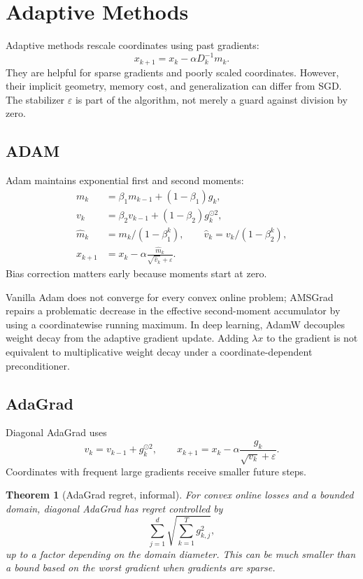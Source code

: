 \documentclass[12pt,oneside]{book}
\numberwithin{equation}{section}
\theoremstyle{definition}
\theoremstyle{plain}
\newtheorem{theorem}{Theorem}[section]
\theoremstyle{remark}
\begin{document}
\section{Adaptive Methods}

Adaptive methods rescale coordinates using past gradients:
\[
    x_{k+1}=x_k-\alpha D_k^{-1}m_k.
\]
They are helpful for sparse gradients and poorly scaled coordinates.
However, their implicit geometry, memory cost, and generalization can differ
from SGD. The stabilizer $\varepsilon$ is part of the algorithm, not merely a
guard against division by zero.

\subsection{ADAM}

Adam maintains exponential first and second moments:
\begin{align*}
 m_k&=\beta_1m_{k-1}+(1-\beta_1)g_k,\\
 v_k&=\beta_2v_{k-1}+(1-\beta_2)g_k^{\odot2},\\
 \widehat m_k&=m_k/(1-\beta_1^k),\qquad
 \widehat v_k=v_k/(1-\beta_2^k),\\
 x_{k+1}&=x_k-\alpha\frac{\widehat m_k}
                    {\sqrt{\widehat v_k}+\varepsilon}.
\end{align*}
Bias correction matters early because moments start at zero.

Vanilla Adam does not converge for every convex online problem; AMSGrad
repairs a problematic decrease in the effective second-moment accumulator by
using a coordinatewise running maximum. In deep learning, AdamW decouples
weight decay from the adaptive gradient update. Adding $\lambda x$ to the
gradient is not equivalent to multiplicative weight decay under a
coordinate-dependent preconditioner.

\subsection{AdaGrad}

Diagonal AdaGrad uses
\[
    v_k=v_{k-1}+g_k^{\odot2},\qquad
    x_{k+1}=x_k-\alpha\frac{g_k}{\sqrt{v_k}+\varepsilon}.
\]
Coordinates with frequent large gradients receive smaller future steps.

\begin{theorem}[AdaGrad regret, informal]
For convex online losses and a bounded domain, diagonal AdaGrad has regret
controlled by
\[
    \sum_{j=1}^d
    \sqrt{\sum_{k=1}^Tg_{k,j}^2},
\]
up to a factor depending on the domain diameter. This can be much smaller
than a bound based on the worst gradient when gradients are sparse.
\end{theorem}
\end{document}
